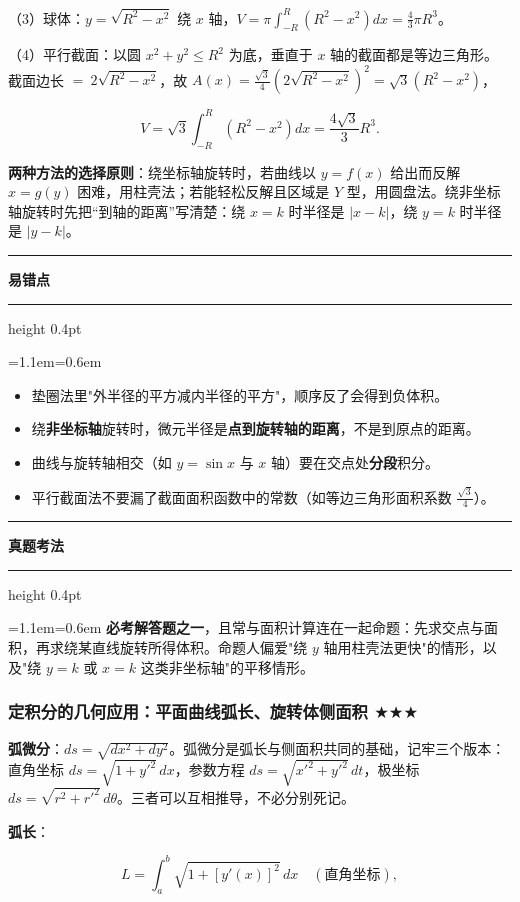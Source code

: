 \documentclass[11pt,openany,UTF8]{ctexbook}
\newcommand{\callouthead}[2]{%
  \par\addvspace{7pt}\noindent
  {\color{#1}\rule[-0.15em]{3pt}{1.05em}}\hspace{0.5em}%
  {\bfseries\color{#1}#2}\par\nobreak\vspace{-0.35em}%
  {\color{rulesep}\hrule height 0.4pt}\nobreak\vspace{0.45em}%
  \begingroup\small\setlength{\parindent}{0pt}%
  \leftskip=1.1em\rightskip=0.6em\noindent\ignorespaces}
\newcommand{\calloutend}{\par\endgroup\addvspace{7pt}}
\newenvironment{callwarn}[1]{\callouthead{warnbar}{#1}}{\calloutend}
\newenvironment{callexam}[1]{\callouthead{exambar}{#1}}{\calloutend}
\begin{document}
（3）球体：$y=\sqrt{R^2-x^2}$ 绕 $x$ 轴，$V=\pi\int_{-R}^{R}(R^2-x^2)dx=\frac{4}{3}\pi R^3$。

（4）平行截面：以圆 $x^2+y^2\leq R^2$ 为底，垂直于 $x$ 轴的截面都是等边三角形。截面边长 $=\ 2\sqrt{R^2-x^2}$，故 $A(x)=\frac{\sqrt{3}}{4}\left(2\sqrt{R^2-x^2}\right)^2=\sqrt{3}\left(R^2-x^2\right)$，

\[V=\sqrt{3}\int_{-R}^{R}\left(R^2-x^2\right)dx=\frac{4\sqrt{3}}{3}R^3.\]

\textbf{两种方法的选择原则}：绕坐标轴旋转时，若曲线以 $y=f(x)$ 给出而反解 $x=g(y)$ 困难，用柱壳法；若能轻松反解且区域是 $Y$ 型，用圆盘法。绕非坐标轴旋转时先把“到轴的距离”写清楚：绕 $x=k$ 时半径是 $\lvert x-k\rvert$，绕 $y=k$ 时半径是 $\lvert y-k\rvert$。

\begin{callwarn}{易错点}
\begin{itemize}
\item 垫圈法里"外半径的平方减内半径的平方"，顺序反了会得到负体积。
\item 绕\textbf{非坐标轴}旋转时，微元半径是\textbf{点到旋转轴的距离}，不是到原点的距离。
\item 曲线与旋转轴相交（如 $y=\sin x$ 与 $x$ 轴）要在交点处\textbf{分段}积分。
\item 平行截面法不要漏了截面面积函数中的常数（如等边三角形面积系数 $\frac{\sqrt{3}}{4}$）。
\end{itemize}
\end{callwarn}

\begin{callexam}{真题考法}
\textbf{必考解答题之一}，且常与面积计算连在一起命题：先求交点与面积，再求绕某直线旋转所得体积。命题人偏爱"绕 $y$ 轴用柱壳法更快"的情形，以及"绕 $y=k$ 或 $x=k$ 这类非坐标轴"的平移情形。

\end{callexam}

\subsubsection{定积分的几何应用：平面曲线弧长、旋转体侧面积 $\bigstar$$\bigstar$$\bigstar$}

\textbf{弧微分}：$ds=\sqrt{dx^2+dy^2}$。弧微分是弧长与侧面积共同的基础，记牢三个版本：直角坐标 $ds=\sqrt{1+y'^2}\,dx$，参数方程 $ds=\sqrt{x'^2+y'^2}\,dt$，极坐标 $ds=\sqrt{r^2+r'^2}\,d\theta$。三者可以互相推导，不必分别死记。

\textbf{弧长}：

\[L=\int_a^b\sqrt{1+\left[y'(x)\right]^2}\,dx\quad(\text{直角坐标}),\]
\end{document}
